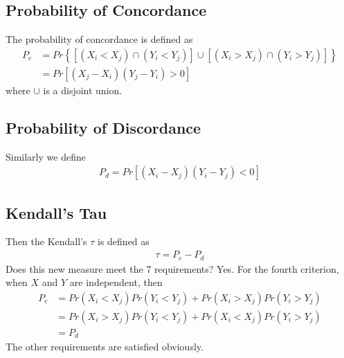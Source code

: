 \documentclass[twoside]{article}
\begin{document}
	\subsection{Probability of Concordance}
	The probability of concordance is defined as
	\begin{align*}
		P_c &= Pr \left\{ \left[ \left( X_i < X_j \right) \cap \left( Y_i < Y_j \right) \right] \cup \left[ \left( X_i > X_j \right) \cap \left( Y_i > Y_j \right) \right]  \right\} \\
		&= Pr \left[ \left( X_j - X_i \right) \left( Y_j - Y_i \right) > 0 \right]
	\end{align*}
	where $\cup$ is a disjoint union. 
	\subsection{Probability of Discordance}
	Similarly we define
	\begin{align*}
		P_d = Pr \left[ \left( X_i - X_j \right) \left( Y_i - Y_j \right) < 0 \right]
	\end{align*}
	\subsection{Kendall's Tau}
	Then the Kendall's $\tau$ is defined as 
	\begin{align*}
		\tau = P_c - P_d
	\end{align*}
	Does this new measure meet the 7 requirements? Yes. For the fourth criterion, when $X$ and $Y$ are independent, then
	\begin{align*}
		P_c &= Pr \left( X_i < X_j \right) Pr \left( Y_i < Y_j \right) + Pr \left( X_i > X_j \right) Pr \left( Y_i > Y_j \right) \\
		&= Pr \left( X_i > X_j \right) Pr \left( Y_i < Y_j \right) + Pr \left( X_i < X_j \right) Pr \left( Y_i > Y_j \right) \\
		&= P_d
	\end{align*}
	The other requirements are satisfied obviously. 
	
\end{document}
